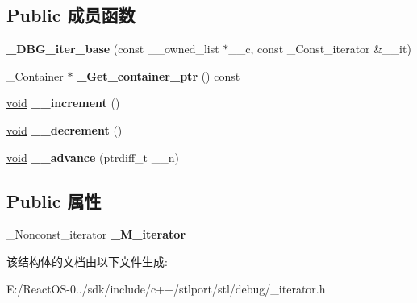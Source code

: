 \subsection*{Public 成员函数}
\begin{DoxyCompactItemize}
\item 
\mbox{\label{struct___d_b_g__iter__base_ad7274190b17b8b18d775c4a2babe9c2d}} 
{\bfseries \+\_\+\+D\+B\+G\+\_\+iter\+\_\+base} (const \+\_\+\+\_\+owned\+\_\+list $\ast$\+\_\+\+\_\+c, const \+\_\+\+Const\+\_\+iterator \&\+\_\+\+\_\+it)
\item 
\mbox{\label{struct___d_b_g__iter__base_a30333847f1e88422c00f322abc0a66e7}} 
\+\_\+\+Container $\ast$ {\bfseries \+\_\+\+Get\+\_\+container\+\_\+ptr} () const
\item 
\mbox{\label{struct___d_b_g__iter__base_a450aa776664db09a866ed993f7a66ee0}} 
\hyperlink{interfacevoid}{void} {\bfseries \+\_\+\+\_\+increment} ()
\item 
\mbox{\label{struct___d_b_g__iter__base_a099681e49f7c12dc33dd5e119f9f56d3}} 
\hyperlink{interfacevoid}{void} {\bfseries \+\_\+\+\_\+decrement} ()
\item 
\mbox{\label{struct___d_b_g__iter__base_a07b7bbdbd8ddca4e24affa6fbe73d315}} 
\hyperlink{interfacevoid}{void} {\bfseries \+\_\+\+\_\+advance} (ptrdiff\+\_\+t \+\_\+\+\_\+n)
\end{DoxyCompactItemize}
\subsection*{Public 属性}
\begin{DoxyCompactItemize}
\item 
\mbox{\label{struct___d_b_g__iter__base_ace7365f06017380cd352144fbc958d32}} 
\+\_\+\+Nonconst\+\_\+iterator {\bfseries \+\_\+\+M\+\_\+iterator}
\end{DoxyCompactItemize}


该结构体的文档由以下文件生成\+:\begin{DoxyCompactItemize}
\item 
E\+:/\+React\+O\+S-\/0../sdk/include/c++/stlport/stl/debug/\+\_\+iterator.\+h\end{DoxyCompactItemize}
